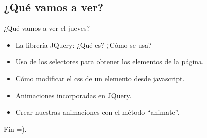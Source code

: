 \documentclass[handout, 10pt]{beamer}
\begin{document}
\subsection{¿Qué vamos a ver?}
\begin{frame}[fragile]
	\pause ¿Qué vamos a ver el jueves?
	
	\begin{itemize}
		\pause \item La librería JQuery: ¿Qué es? ¿Cómo se usa?
		\pause \item Uso de los selectores para obtener los elementos de la página.
		\pause \item Cómo modificar el css de un elemento desde javascript.
		\pause \item Animaciones incorporadas en JQuery.
		\pause \item Crear nuestras animaciones con el método ``animate''.
	\end{itemize}
\end{frame}

\begin{frame}
	\begin{center}
		Fin =).
	\end{center}
\end{frame}
\end{document}
